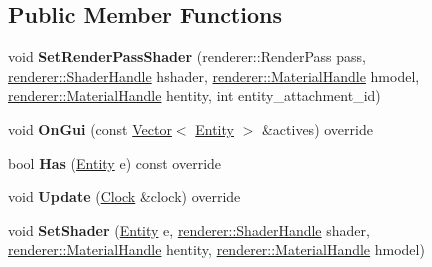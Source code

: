 \subsection*{Public Member Functions}
\begin{DoxyCompactItemize}
\item 
\mbox{\label{classnabla_1_1_renderable_system_a488724663300391e590444f9987a0b06}} 
void {\bfseries Set\+Render\+Pass\+Shader} (renderer\+::\+Render\+Pass pass, \mbox{\hyperlink{classnabla_1_1renderer_1_1_handle}{renderer\+::\+Shader\+Handle}} hshader, \mbox{\hyperlink{classnabla_1_1renderer_1_1_handle}{renderer\+::\+Material\+Handle}} hmodel, \mbox{\hyperlink{classnabla_1_1renderer_1_1_handle}{renderer\+::\+Material\+Handle}} hentity, int entity\+\_\+attachment\+\_\+id)
\item 
\mbox{\label{classnabla_1_1_renderable_system_a75495809c4d7b1f6506e3f2b67653315}} 
void {\bfseries On\+Gui} (const \mbox{\hyperlink{classnabla_1_1_s_t_l_vector_ex}{Vector}}$<$ \mbox{\hyperlink{structnabla_1_1_entity}{Entity}} $>$ \&actives) override
\item 
\mbox{\label{classnabla_1_1_renderable_system_a3af7f6c839f0ee4d35f068d899cd4334}} 
bool {\bfseries Has} (\mbox{\hyperlink{structnabla_1_1_entity}{Entity}} e) const override
\item 
\mbox{\label{classnabla_1_1_renderable_system_a339791eed56bdf8e99f0d31f8c051e1d}} 
void {\bfseries Update} (\mbox{\hyperlink{classnabla_1_1_clock}{Clock}} \&clock) override
\item 
\mbox{\label{classnabla_1_1_renderable_system_ad336a974291eaa6997b00b1328ca85f8}} 
void {\bfseries Set\+Shader} (\mbox{\hyperlink{structnabla_1_1_entity}{Entity}} e, \mbox{\hyperlink{classnabla_1_1renderer_1_1_handle}{renderer\+::\+Shader\+Handle}} shader, \mbox{\hyperlink{classnabla_1_1renderer_1_1_handle}{renderer\+::\+Material\+Handle}} hentity, \mbox{\hyperlink{classnabla_1_1renderer_1_1_handle}{renderer\+::\+Material\+Handle}} hmodel)
\item 
\mbox{\label{classnabla_1_1_renderable_system_a929582306e2589f9cb41447be1d41e94}} 

\end{DoxyCompactItemize}
